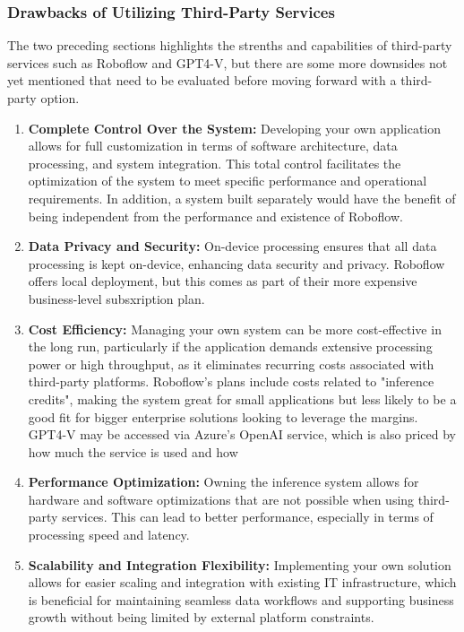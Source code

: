 \subsubsection{Drawbacks of Utilizing Third-Party Services}
The two preceding sections highlights the strenths and capabilities of third-party services such as Roboflow and GPT4-V, but there are some more downsides not yet mentioned that need to be evaluated before moving forward with a third-party option.

\begin{enumerate}
    \item \textbf{Complete Control Over the System:} Developing your own application allows for full customization in terms of software architecture, data processing, and system integration. This total control facilitates the optimization of the system to meet specific performance and operational requirements. In addition, a system built separately would have the benefit of being independent from the performance and existence of Roboflow.
    \item \textbf{Data Privacy and Security:} On-device processing ensures that all data processing is kept on-device, enhancing data security and privacy. Roboflow offers local deployment, but this comes as part of their more expensive business-level subsxription plan.
    \item \textbf{Cost Efficiency:} Managing your own system can be more cost-effective in the long run, particularly if the application demands extensive processing power or high throughput, as it eliminates recurring costs associated with third-party platforms. Roboflow's plans include costs related to "inference credits", making the system great for small applications but less likely to be a good fit for bigger enterprise solutions looking to leverage the margins. GPT4-V may be accessed via Azure's OpenAI service, which is also priced by how much the service is used and how
    \item \textbf{Performance Optimization:} Owning the inference system allows for hardware and software optimizations that are not possible when using third-party services. This can lead to better performance, especially in terms of processing speed and latency.
    \item \textbf{Scalability and Integration Flexibility:} Implementing your own solution allows for easier scaling and integration with existing IT infrastructure, which is beneficial for maintaining seamless data workflows and supporting business growth without being limited by external platform constraints.
\end{enumerate}


